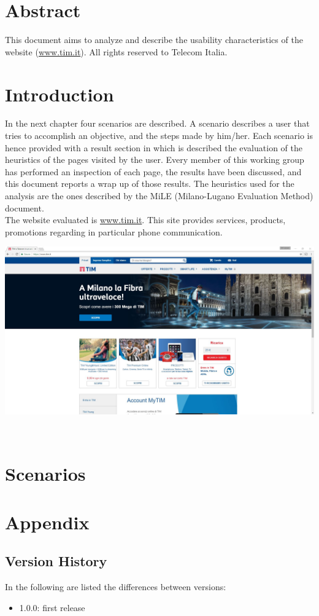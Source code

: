 \documentclass{../Common/Structure/doc_pdf}
\begin{document}
\titleToc

\chapter{Abstract}
This document aims to analyze and describe the usability characteristics of the website (\url{www.tim.it}). All rights reserved to Telecom Italia.

\chapter{Introduction}
In the next chapter four scenarios are described. A scenario describes a user that tries to accomplish an objective, and the steps made by him/her. Each scenario is hence provided with a result section in which is described the evaluation of the heuristics of the pages visited by the user. Every member of this working group has performed an inspection of each page, the results have been discussed, and this document reports a wrap up of those results. The heuristics used for the analysis are the ones described by the MiLE (Milano-Lugano Evaluation Method) document.\\
The website evaluated is \url{www.tim.it}. This site provides services, products, promotions regarding in particular phone communication.
\vspace{1cm}
\begin{center}
	\includegraphics[width=\textwidth]{Screenshot/homepage.jpg}
\end{center}

\
\chapter{Scenarios}





\appendix
\chapter{Appendix}
\section{Version History}
In the following are listed the differences between versions:
\begin{itemize}
	\item 1.0.0: first release
\end{itemize}
\end{document}
